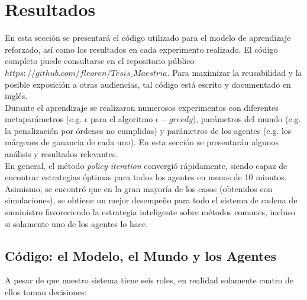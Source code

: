 \chapter{Resultados}


En esta secci\'on se presentar\'a el c\'odigo utilizado para el modelo de aprendizaje reforzado, as\'i como los resultados en cada experimento realizado. El c\'odigo completo puede consultarse en el repositorio p\'ublico $https://github.com/fleoren/Tesis\_Maestria$. Para maximizar la reusabilidad y la posible exposici\'on a otras audiencias, tal c\'odigo est\'a escrito y documentado en ingl\'es.\\

Durante el aprendizaje se realizaron numerosos experimentos con diferentes metapar\'ametros (e.g. $\epsilon$ para el algoritmo $\epsilon-greedy$), par\'ametros del mundo (e.g. la penalizaci\'on por \'ordenes no cumplidas) y par\'ametros de los agentes (e.g. los m\'argenes de ganancia de cada uno). En esta secci\'on se presentar\'an algunos an\'alisis y resultados relevantes.\\

En general, el m\'etodo \textit{policy iteration} convergi\'o r\'apidamente, siendo capaz de encontrar estrategias \'optimas para todos los agentes en menos de 10 minutos. Asimismo, se encontr\'o que en la gran mayor\'ia de los casos (obtenidos con simulaciones), se obtiene un mejor desempe\~no para todo el sistema de cadena de suministro favoreciendo la estrategia inteligente sobre m\'etodos comunes, incluso si solamente uno de los agentes lo hace.

\section{C\'odigo: el Modelo, el Mundo y los Agentes}

A pesar de que nuestro sistema tiene seis roles, en realidad solamente cuatro de ellos toman decisiones:

